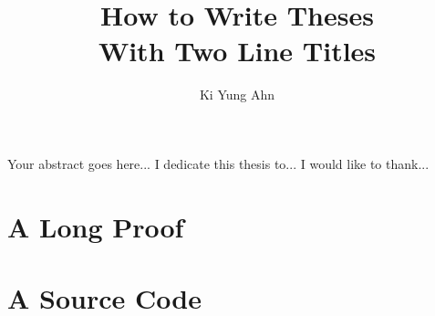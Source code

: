 \documentclass[12pt]{report}
\numberwithin{equation}{section}
\numberwithin{proposition}{section}
\numberwithin{theorem}{section}
\numberwithin{lemma}{section}
\numberwithin{corollary}{section}
\begin{document}
\title{How to Write Theses \\ With Two Line Titles}

\author{Ki Yung Ahn}

\titlep
\prefatory
{}
    Your abstract goes here...
    I dedicate this thesis to...
    I would like to thank...

\afterpreface
\body





\appendix
\chapter{A Long Proof}
\chapter{A Source Code}
\end{document}
